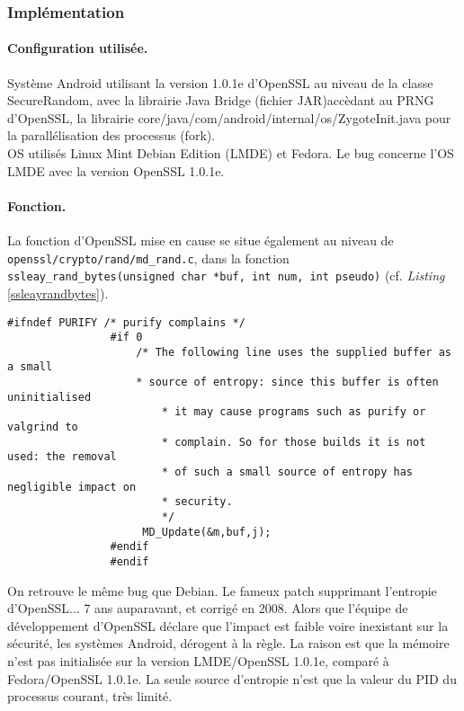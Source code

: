 		
		\subsubsection{Implémentation}
			
			\paragraph{Configuration utilisée.\\}

			Système Android utilisant la version 1.0.1e d'OpenSSL au niveau de la classe SecureRandom, avec la librairie Java Bridge (fichier JAR)accèdant au PRNG d'OpenSSL, la librairie core/java/com/android/internal/os/ZygoteInit.java pour la parallélisation des processus (fork).\\
			
			OS utilisés Linux Mint Debian Edition (LMDE) et Fedora. Le bug concerne l'OS LMDE avec la version OpenSSL 1.0.1e. 

			\paragraph{Fonction.\\}
			
			La fonction d'OpenSSL mise en cause se situe également au niveau de \texttt{openssl/crypto/rand/md\_rand.c}, dans la fonction \texttt{ssleay\_rand\_bytes(unsigned char *buf, int num, int pseudo)} (cf. \textit{Listing} \ref{ssleayrandbytes}).
		
			\begin{lstlisting}[style=customc,caption=ssleay\_rand\_bytes.c,
			 label=ssleayrandbytes]
				#ifndef PURIFY /* purify complains */
				#if 0
				    /* The following line uses the supplied buffer as a small
				    * source of entropy: since this buffer is often uninitialised
				        * it may cause programs such as purify or valgrind to
				        * complain. So for those builds it is not used: the removal
				        * of such a small source of entropy has negligible impact on
				        * security.
				        */
				     MD_Update(&m,buf,j);
				#endif
				#endif
			\end{lstlisting}
			
			On retrouve le même bug que Debian. Le fameux patch supprimant l'entropie d'OpenSSL... 7 ans auparavant, et corrigé en 2008. Alors que l'équipe de développement d'OpenSSL déclare que l'impact est faible voire inexistant sur la sécurité, les systèmes Android, dérogent à la règle. La raison est que la mémoire n'est pas initialisée sur la version LMDE/OpenSSL 1.0.1e, comparé à Fedora/OpenSSL 1.0.1e. La seule source d'entropie n'est que la valeur du PID du processus courant, très limité.


